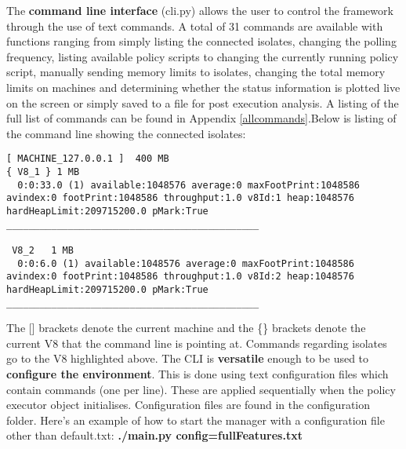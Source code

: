 \documentclass{l4proj}
\begin{document}
\hspace*{3em} The \textbf{command line interface} (cli.py) allows the user to control the framework through the use of text commands. A total of 31 commands are available with functions ranging from simply listing the connected isolates, changing the polling frequency, listing available policy scripts to changing the currently running policy script, manually sending memory limits to isolates, changing the total memory limits on machines and determining whether the status information is plotted live on the screen or simply saved to a file for post execution analysis. A listing of the full list of commands can be found in Appendix \ref{allcommands}.Below is listing of the command line showing the connected
isolates:
\begin{lstlisting}
[ MACHINE_127.0.0.1 ]  400 MB
{ V8_1 } 1 MB
  0:0:33.0 (1) available:1048576 average:0 maxFootPrint:1048586 avindex:0 footPrint:1048586 throughput:1.0 v8Id:1 heap:1048576 hardHeapLimit:209715200.0 pMark:True 
_____________________________________________

 V8_2   1 MB
  0:0:6.0 (1) available:1048576 average:0 maxFootPrint:1048586 avindex:0 footPrint:1048586 throughput:1.0 v8Id:2 heap:1048576 hardHeapLimit:209715200.0 pMark:True 
_____________________________________________
\end{lstlisting}
\hspace*{3em} The [] brackets denote the current machine and the \{\} brackets denote the current V8 that the command line is pointing at. Commands regarding isolates go to the V8 highlighted above. The CLI is \textbf{versatile} enough to be used to \textbf{configure the environment}. This is done using text configuration files which contain commands (one per line). These are applied sequentially when the policy executor object initialises. Configuration files are found in the configuration folder. Here's an example of how to start the manager with a configuration file other than default.txt: \textbf{./main.py config=fullFeatures.txt} 
\end{document}
